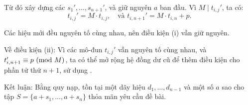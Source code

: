 \documentclass[../09-contruction-methods.tex]{subfiles}
\begin{document}
\begin{soln}
	Từ đó xây dựng các \( s_1', \dots, s_{n+1}' \), và giữ nguyên \( a \) ban đầu.  
	Vì \( M \mid t_{i,j}' \), ta có:
	\[
		t_{i,j}' = M \cdot t_{i,j}, \quad \text{và } t_{i,n+1}' = M \cdot t_{i,n} + p.
	\]
	
	Các hiệu mới đều nguyên tố cùng nhau, nên điều kiện (i) vẫn giữ nguyên.
	
	Về điều kiện (ii): Vì các mô-đun \( t_{i,j}' \) vẫn nguyên tố cùng nhau, và \( t_{i,n+1}' \equiv p \ (\mathrm{mod}\ M) \),
	ta có thể mở rộng hệ đồng dư cũ để thêm điều kiện cho phần tử thứ \( n+1 \), sử dụng .
	
	Kết luận: Bằng quy nạp, tồn tại một dãy hiệu \( d_1, \dots, d_{n-1} \) và một số \( a \) sao cho tập \( S = \{ a + s_1, \dots, a + s_n \} \) thỏa mãn yêu cầu đề bài.
\end{soln}

\end{document}

